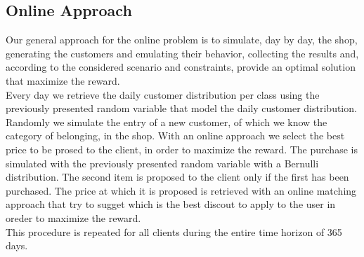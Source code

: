 \subsection*{Online Approach}
Our general approach for the online problem is to simulate, day by day, the shop, generating the customers and emulating their behavior, collecting the results and, according to the considered scenario and constraints, provide an optimal solution that maximize the reward.\\
Every day we retrieve the daily customer distribution per class using the previously presented random variable that model the daily customer distribution. Randomly we simulate the entry of a new customer, of which we know the category of belonging, in the shop. With an online approach we select the best price to be prosed to the client, in order to maximize the reward. The purchase is simulated with the previously presented random variable with a Bernulli distribution.
The second item is proposed to the client only if the first has been purchased. The price at which it is proposed is retrieved with an online matching approach that try to sugget which is the best discout to apply to the user in oreder to maximize the reward.\\
This procedure is repeated for all clients during the entire time horizon of 365 days. 
